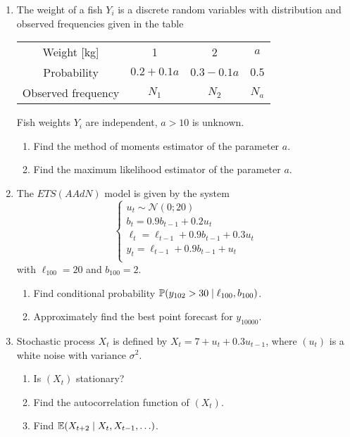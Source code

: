 \begin{enumerate}

\item The weight of a fish $Y_i$ is a discrete random variables with 
distribution and observed frequencies given in the table 

\begin{tabular}{cccc}
    \toprule
    Weight [kg] & 1 & 2 & $a$ \\
    Probability & $0.2 + 0.1a$ & $0.3 - 0.1a$ & $0.5$ \\
    Observed frequency & $N_1$ & $N_2$ & $N_a$ \\
    \bottomrule
\end{tabular}

Fish weights $Y_i$ are independent, $a > 10$ is unknown. 

\begin{enumerate}
    \item Find the method of moments estimator of the parameter $a$. 
    \item Find the maximum likelihood estimator of the parameter $a$. 
\end{enumerate}


\item The $ETS(AAdN)$ model is given by the system
    \[
    \begin{cases}
    u_t  \sim \mathcal{N}(0;20) \\
    b_t = 0.9 b_{t-1} + 0.2 u_t \\
    \ell_t = \ell_{t-1} + 0.9 b_{t-1} + 0.3 u_t \\
    y_t = \ell_{t-1} + 0.9 b_{t-1} + u_t \\
    \end{cases}
    \]
    with $\ell_{100} = 20$ and $b_{100} = 2$.
\begin{enumerate}
    \item Find conditional probability $\P(y_{102} > 30 \mid \ell_{100}, b_{100})$.
    \item Approximately find the best point forecast for $y_{10000}$.
\end{enumerate}
    
\item Stochastic process $X_t$ is defined by $X_t = 7 + u_t + 0.3 u_{t-1}$, where $(u_t)$ is a white noise 
with variance $\sigma^2$.
\begin{enumerate}
    \item Is $(X_t)$ stationary? 
    \item Find the autocorrelation function of $(X_t)$.
    \item Find $\E(X_{t+2} \mid X_t, X_{t-1}, \ldots)$.
\end{enumerate}


\end{enumerate}
